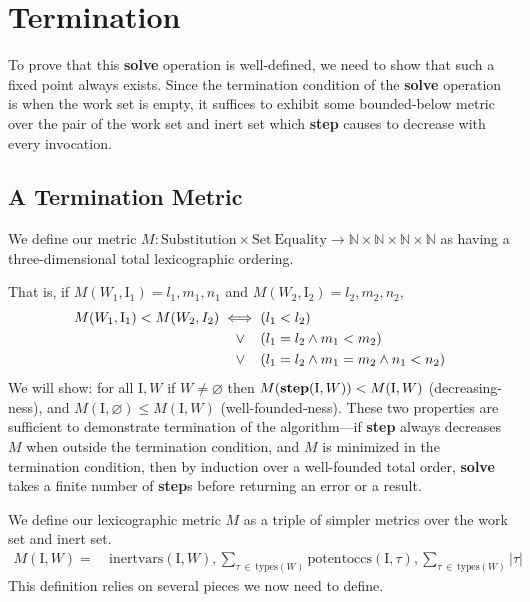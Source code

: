 \documentclass[10pt, letterpaper, oneside]{article}
\newcommand{\inertset}{\text{I}}
\begin{document}
\section{Termination}

To prove that this \textbf{solve} operation is well-defined, we need to show that such a fixed point always exists. Since the termination condition of the \textbf{solve} operation is when the work set is empty, it suffices to exhibit some bounded-below metric over the pair of the work set and inert set which \textbf{step} causes to decrease with every invocation.

\subsection{A Termination Metric}

We define our metric \(M : \text{Substitution} \times \text{Set}~\text{Equality} \to \mathbb{N} \times \mathbb{N} \times \mathbb{N} \times \mathbb{N}\) as having a three-dimensional total lexicographic ordering.

That is, if \(M(W_1, \inertset_1) = l_1, m_1, n_1\) and \(M(W_2, \inertset_2) = l_2, m_2, n_2\),
\begin{alignat*}{1}
  M(W_1, \inertset_1) < M(W_2, I_2) \iff (&l_1 < l_2)\\
                      \lor\hspace{1.1em}(&l_1 = l_2 \land m_1 < m_2)\\
                      \lor\hspace{1.1em}(&l_1 = l_2 \land m_1 = m_2 \land n_1 < n_2)
\end{alignat*}
We will show: for all \(\inertset, W\) if \(W \ne \varnothing\) then \(M(\text{\bf step}(\inertset, W)) < M(\inertset, W)\) (decreasing-ness), and \(M(\inertset, \varnothing) \le M(\inertset, W)\) (well-founded-ness). These two properties are sufficient to demonstrate termination of the algorithm---if \textbf{step} always decreases \(M\) when outside the termination condition, and \(M\) is minimized in the termination condition, then by induction over a well-founded total order, \textbf{solve} takes a finite number of \textbf{step}s before returning an error or a result.

We define our lexicographic metric \(M\) as a triple of simpler metrics over the work set and inert set.
\begin{align*}
  M(\inertset, W) = &~\text{inertvars}(\inertset, W), \!\!\!\!\!\sum_{\tau\,\in\,\text{types}(W)}\!\!\!\!\!\!\!\!\text{potentoccs}(\inertset, \tau), \!\!\!\!\!\sum_{\tau\,\in\,\text{types}(W)}\!\!\!\!\!\!\!\!|\tau|
\end{align*}
This definition relies on several pieces we now need to define.
\end{document}
